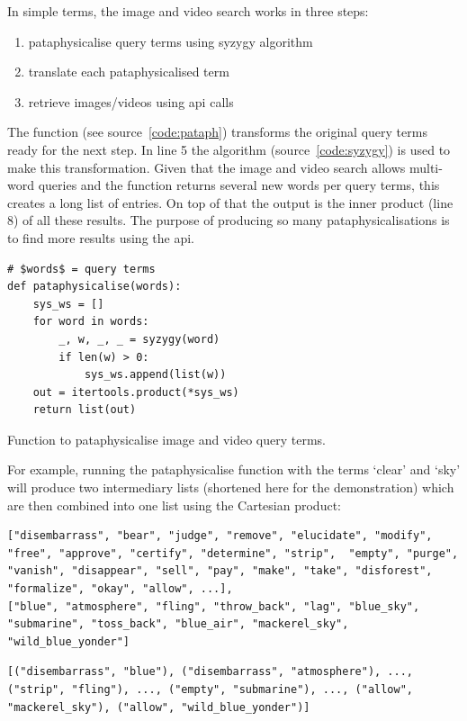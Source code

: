 In simple terms, the image and video search works in three steps:
\begin{enumerate}
  \item pataphysicalise query terms using syzygy algorithm
  \item translate each pataphysicalised term
  \item retrieve images/videos using \acs{api} calls
\end{enumerate}

The  function (see source~\ref{code:pataph}) transforms the original query terms ready for the next step. In line \num{5} the  algorithm (source~\ref{code:syzygy}) is used to make this transformation. Given that the image and video search allows multi-word queries and the  function returns several new words per query terms, this creates a long list of entries. On top of that the output is the inner product (line 8) of all these results. The purpose of producing so many pataphysicalisations is to find more results using the \ac{api}.

\begin{listing}
  \begin{verbatim}
# $words$ = query terms
def pataphysicalise(words):
    sys_ws = []
    for word in words:
        _, w, _, _ = syzygy(word)
        if len(w) > 0:
            sys_ws.append(list(w))
    out = itertools.product(*sys_ws)
    return list(out)
  \end{verbatim}
\caption{Function to pataphysicalise image and video query terms.}
\label{code:pataph}
\end{listing}

For example, running the pataphysicalise function with the terms `clear' and `sky' will produce two intermediary lists (shortened here for the demonstration) which are then combined into one list using the Cartesian product:

\begin{verbatim}
["disembarrass", "bear", "judge", "remove", "elucidate", "modify", "free", "approve", "certify", "determine", "strip",  "empty", "purge", "vanish", "disappear", "sell", "pay", "make", "take", "disforest", "formalize", "okay", "allow", ...],
["blue", "atmosphere", "fling", "throw_back", "lag", "blue_sky", "submarine", "toss_back", "blue_air", "mackerel_sky", "wild_blue_yonder"]
\end{verbatim}
\begin{verbatim}
[("disembarrass", "blue"), ("disembarrass", "atmosphere"), ..., ("strip", "fling"), ..., ("empty", "submarine"), ..., ("allow", "mackerel_sky"), ("allow", "wild_blue_yonder")]
\end{verbatim}

